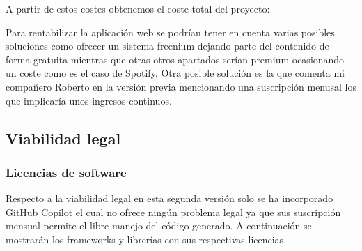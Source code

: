 A partir de estos costes obtenemos el coste total del proyecto:
\begin{table}[H]
	\centering
	\caption{Costes totales}
\end{table}

Para rentabilizar la aplicación web se podrían tener en cuenta varias posibles soluciones como ofrecer un sistema freenium dejando parte del contenido de forma gratuita mientras que otras otros apartados serían premium ocasionando un coste como es el caso de Spotify. Otra posible solución es la que comenta mi compañero Roberto en la versión previa mencionando una suscripción menusal los que implicaría unos ingresos continuos\cite{previotfganexos}.

\subsection{Viabilidad legal}
\subsubsection{Licencias de software}
Respecto a la viabilidad legal en esta segunda versión solo se ha incorporado GitHub Copilot el cual no ofrece ningún problema legal ya que sus suscripción mensual permite el libre manejo del código generado. A continuación se mostrarán los frameworks y librerías con sus respectivas licencias.

